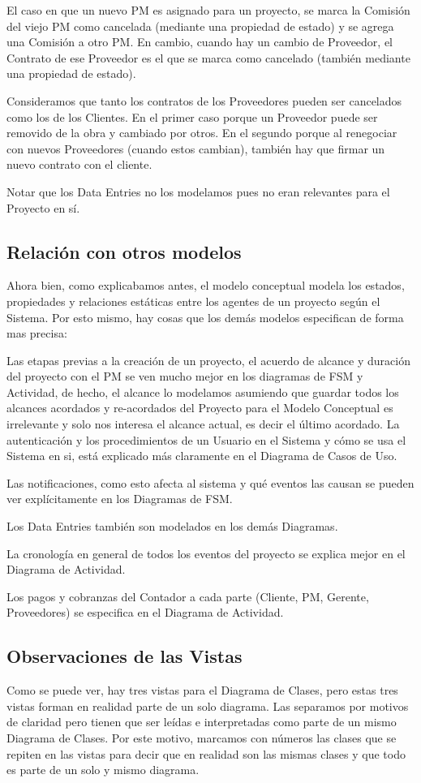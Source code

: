 El caso en que un nuevo PM es asignado para un proyecto, se marca la Comisión del viejo PM como cancelada (mediante una propiedad de estado) y se agrega una Comisión a otro PM. En cambio, cuando hay un cambio de Proveedor, el Contrato de ese Proveedor es el que se marca como cancelado (también mediante una propiedad de estado).

Consideramos que tanto los contratos de los Proveedores pueden ser cancelados como los de los Clientes. En el primer caso porque un Proveedor puede ser removido de la obra y cambiado por otros. En el segundo porque al renegociar con nuevos Proveedores (cuando estos cambian), también hay que firmar un nuevo contrato con el cliente.

Notar que los Data Entries no los modelamos pues no eran relevantes para el Proyecto en sí.

\subsection{Relación con otros modelos}
Ahora bien, como explicabamos antes, el modelo conceptual modela los estados, propiedades y relaciones estáticas entre los agentes de un proyecto según el Sistema. Por esto mismo, hay cosas que los demás modelos especifican de forma mas precisa:

Las etapas previas a la creación de un proyecto, el acuerdo de alcance y duración del proyecto con el PM se ven mucho mejor en los diagramas de FSM y Actividad, de hecho, el alcance lo modelamos asumiendo que guardar todos los alcances acordados y re-acordados del Proyecto para el Modelo Conceptual es irrelevante y solo nos interesa el alcance actual, es decir el último acordado.
La autenticación y los procedimientos de un Usuario en el Sistema y cómo se usa el Sistema en si, está explicado más claramente en el Diagrama de Casos de Uso.

Las notificaciones, como esto afecta al sistema y qué eventos las causan se pueden ver explícitamente en los Diagramas de FSM. 

Los Data Entries también son modelados en los demás Diagramas. 

La cronología en general de todos los eventos del proyecto se explica mejor en el Diagrama de Actividad.

Los pagos y cobranzas del Contador a cada parte (Cliente, PM, Gerente, Proveedores) se especifica en el Diagrama de Actividad.

\subsection{Observaciones de las Vistas}
Como se puede ver, hay tres vistas para el Diagrama de Clases, pero estas tres vistas forman en realidad parte de un solo diagrama. Las separamos por motivos de claridad pero tienen que ser leídas e interpretadas como parte de un mismo Diagrama de Clases. Por este motivo, marcamos con números las clases que se repiten en las vistas para decir que en realidad son las mismas clases y que todo es parte de un solo y mismo diagrama.

